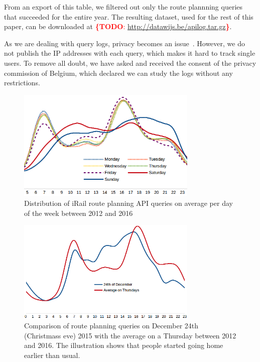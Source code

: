 \documentclass{sig-alternate}
\newcommand{\todo}[1]{\noindent\textcolor{red}{{\bf \{TODO}: #1{\bf \}}}}
\begin{document}
From an export of this table, we filtered out only the route plannning queries that succeeded for the entire year.
The resulting dataset, used for the rest of this paper, can be downloaded at \todo{\url{http://datawijs.be/apilog.tar.gz}}.

As we are dealing with query logs, privacy becomes an issue~\cite{silvestri}.
However, we do not publish the IP addresses with each query, which makes it hard to track single users.
To remove all doubt, we have asked and received the consent of the privacy commission of Belgium, which declared we can study the logs without any restrictions.

\begin{figure}
\centering
\includegraphics[width=8.6cm,align=center]{avg-all}
\caption{Distribution of iRail route planning API queries on average per day of the week between 2012 and 2016}
\label{fig:average}
\end{figure}


\begin{figure}
\centering
\includegraphics[width=8.6cm,align=center]{dec24}
\caption{Comparison of route planning queries on December 24th (Christmass eve) 2015 with the average on a Thursday between 2012 and 2016. The illustration shows that people started going home earlier than usual.}
\label{fig:dec24}
\end{figure}
\end{document}
